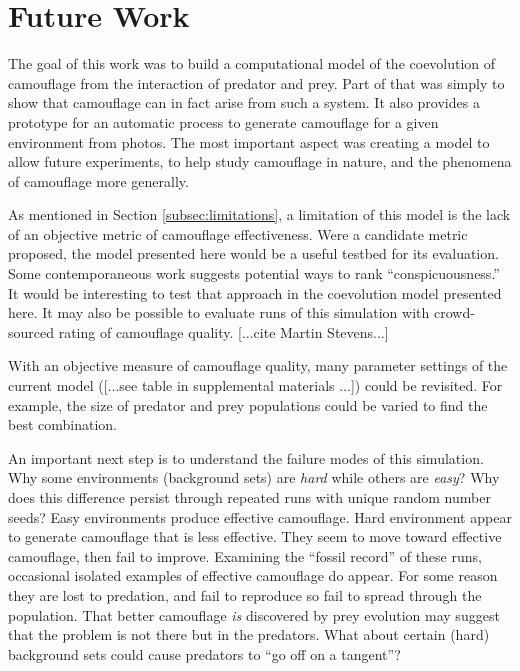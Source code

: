 \documentclass[acmtog]{acmart}
\begin{document}
\section{Future Work}
The goal of this work was to build a computational model of the coevolution of camouflage from the interaction of predator and prey. Part of that was simply to show that camouflage can in fact arise from such a system. It also provides a prototype for an automatic process to generate camouflage for a given environment from photos. The most important aspect was creating a model to allow future experiments, to help study camouflage in nature, and the phenomena of camouflage more generally.
\par
As mentioned in Section \ref{subsec:limitations}, a limitation of this model is the lack of an objective metric of camouflage effectiveness. Were a candidate metric proposed, the model presented here would be a useful testbed for its evaluation. Some contemporaneous work \cite{lv_cod_2022} suggests potential ways to rank “conspicuousness.” It would be interesting to test that approach in the coevolution model presented here. It may also be possible to evaluate runs of this simulation with crowd-sourced rating of camouflage quality. [...cite Martin Stevens...]
\par
With an objective measure of camouflage quality, many parameter settings of the current model ([...see table in supplemental materials ...]) could be revisited. For example, the size of predator and prey populations could be varied to find the best combination. 
\par
An important next step is to understand the failure modes of this simulation. Why some environments (background sets) are \textit{hard} while others are \textit{easy}? Why does this difference persist through repeated runs with unique random number seeds?
Easy environments produce effective camouflage. Hard environment appear to generate camouflage that is less effective. They seem to move toward effective camouflage, then fail to improve. Examining the “fossil record” of these runs, occasional isolated examples of effective camouflage do appear. For some reason they are lost to predation, and fail to reproduce so fail to spread through the population. That better camouflage \textit{is} discovered by prey evolution may suggest that the problem is not there but in the predators. What about certain (hard) background sets could cause predators to “go off on a tangent”?
\end{document}

